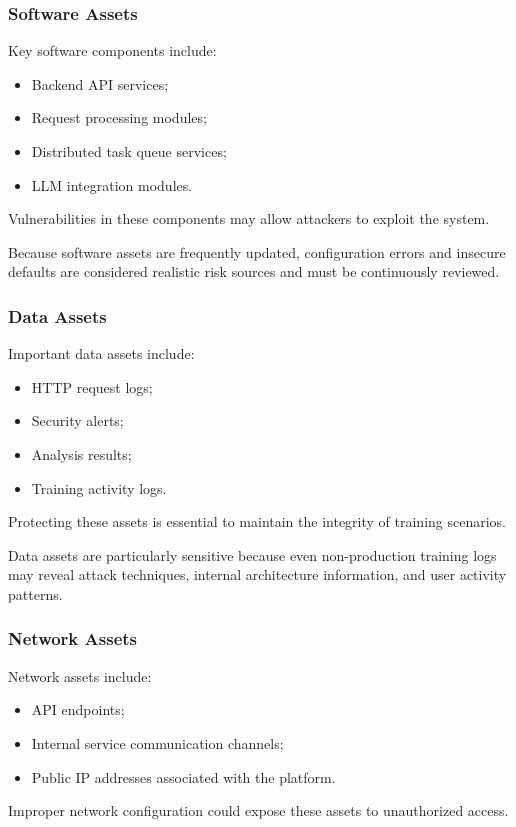 \subsubsection{Software Assets}
Key software components include:
\begin{itemize}
    \item Backend API services;
    \item Request processing modules;
    \item Distributed task queue services;
    \item LLM integration modules.
\end{itemize}
Vulnerabilities in these components may allow attackers to exploit the system.

Because software assets are frequently updated, configuration errors and insecure defaults are considered realistic risk sources and must be continuously reviewed.

\subsubsection{Data Assets}
Important data assets include:
\begin{itemize}
    \item HTTP request logs;
    \item Security alerts;
    \item Analysis results;
    \item Training activity logs.
\end{itemize}
Protecting these assets is essential to maintain the integrity of training scenarios.

Data assets are particularly sensitive because even non-production training logs may reveal attack techniques, internal architecture information, and user activity patterns.

\subsubsection{Network Assets}
Network assets include:
\begin{itemize}
    \item API endpoints;
    \item Internal service communication channels;
    \item Public IP addresses associated with the platform.
\end{itemize}
Improper network configuration could expose these assets to unauthorized access.

